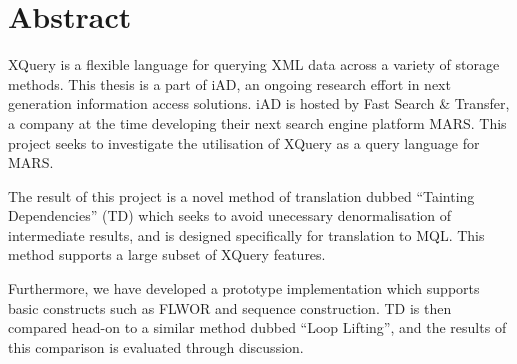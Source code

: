 \chapter*{Abstract}
XQuery is a flexible language for querying XML data across a variety of storage
methods. This thesis is a part of iAD, an ongoing research effort in
next generation information access solutions. iAD is hosted by Fast Search \&
Transfer, a company at the time developing their next search engine platform
MARS. This project seeks to investigate the utilisation of XQuery as a query
language for MARS.

The result of this project is a novel method of translation dubbed ``Tainting
Dependencies'' (TD) which seeks to avoid unecessary
denormalisation of intermediate results, and is designed specifically
for translation to MQL. This method supports a large subset of XQuery features.

Furthermore, we have developed a prototype implementation which supports basic
constructs such as FLWOR and sequence construction. TD is
then compared head-on to a similar method dubbed ``Loop Lifting'', and the
results of this comparison is evaluated through discussion.

% 
